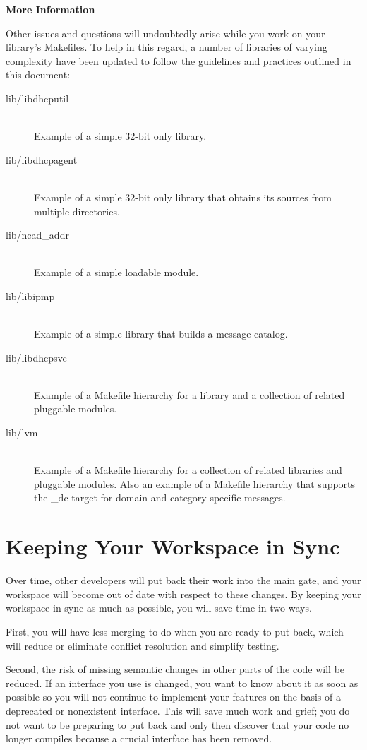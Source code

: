 \documentclass{article}
\begin{document}
\vspace{0.1cm}
{\bf More Information}

\vspace{0.1cm}
Other issues and questions will undoubtedly arise while you work on your
library's Makefiles. To help in this regard, a number of libraries of varying
complexity have been updated to follow the guidelines and practices outlined in
this document:

\begin{description}
\item[lib/libdhcputil] \hfill \\
  Example of a simple 32-bit only library.
\item[lib/libdhcpagent] \hfill \\
  Example of a simple 32-bit only library that obtains its sources from multiple
  directories.
\item[lib/ncad\_addr] \hfill \\
  Example of a simple loadable module.
\item[lib/libipmp] \hfill \\
  Example of a simple library that builds a message catalog.
\item[lib/libdhcpsvc] \hfill \\
  Example of a Makefile hierarchy for a library and a collection of related
  pluggable modules.
\item[lib/lvm] \hfill \\
  Example of a Makefile hierarchy for a collection of related libraries and
  pluggable modules. Also an example of a Makefile hierarchy that supports the
  \_dc target for domain and category specific messages.
\end{description}

\section*{Keeping Your Workspace in Sync}

Over time, other developers will put back their work into the main gate, and
your workspace will become out of date with respect to these changes. By
keeping your workspace in sync as much as possible, you will save time in two
ways.

First, you will have less merging to do when you are ready to put back, which
will reduce or eliminate conflict resolution and simplify testing.

Second, the risk of missing semantic changes in other parts of the code will be
reduced. If an interface you use is changed, you want to know about it as soon
as possible so you will not continue to implement your features on the basis of
a deprecated or nonexistent interface. This will save much work and grief; you
do not want to be preparing to put back and only then discover that your code
no longer compiles because a crucial interface has been removed.
\end{document}

